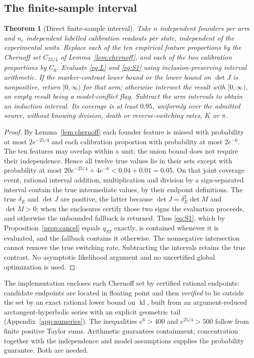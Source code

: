 \documentclass[11pt]{article}
\newtheorem{theorem}{Theorem}[section]
\theoremstyle{definition}
\newcommand{\kl}{\operatorname{kl}}
\begin{document}
\subsection{The finite-sample interval}
\begin{theorem}[Direct finite-sample interval]\label{thm:CI}
Take $n$ independent founders per arm and $n_c$ independent labelled calibration
readouts per state, independent of the experimental units. Replace each of the
ten empirical feature proportions by the Chernoff set $C_{25/4}$ of
Lemma~\ref{lem:chernoff}, and each of the two calibration proportions by
$C_{6}$. Evaluate \eqref{eq:L} and \eqref{eq:S1} using inclusion-preserving
interval arithmetic. If the marker-contrast lower bound or the lower bound on
$\det J$ is nonpositive, return $[0,\infty)$ for that arm; otherwise intersect
the result with $[0,\infty)$, an empty result being a model-conflict flag.
Subtract the arm intervals to obtain an induction interval. Its coverage is at
least $0.95$, uniformly over the admitted source, without knowing division,
death or reverse-switching rates, $K$ or $\pi$.
\end{theorem}
\begin{proof}
By Lemma~\ref{lem:chernoff} each founder feature is missed with probability at
most $2e^{-25/4}$ and each calibration proportion with probability at most
$2e^{-6}$. The ten features may overlap within a unit; the union bound does not
require their independence. Hence all twelve true values lie in their sets
except with probability at most $20e^{-25/4}+4e^{-6}<0.04+0.01=0.05$. On that
joint coverage event, rational interval addition, multiplication and division by
a sign-separated interval contain the true intermediate values, by their
endpoint definitions. The true $\delta_E$ and $\det J$ are positive, the
latter because $\det J=\delta_E^2\det M$ and $\det M>0$; when the enclosures
certify those two signs the evaluation proceeds, and otherwise the unbounded
fallback is returned. Thus
\eqref{eq:S1}, which by Proposition~\ref{prop:cancel} equals $q_{ST}$ exactly,
is contained whenever it is evaluated, and the fallback contains it
otherwise. The nonnegative intersection cannot remove the true switching rate.
Subtracting the intervals retains the true contrast. No asymptotic likelihood
argument and no uncertified global optimization is used.
\end{proof}

The implementation encloses each Chernoff set by certified rational endpoints:
candidate endpoints are located in floating point and then \emph{verified} to lie
outside the set by an exact rational lower bound on $\kl$, built from an
argument-reduced arctangent-hyperbolic series with an explicit geometric tail
(Appendix~\ref{app:numerics}). The inequalities $e^6>400$ and $e^{25/4}>500$
follow from finite positive Taylor sums. Arithmetic guarantees containment;
concentration together with the independence and model assumptions supplies the
probability guarantee. Both are needed.
\end{document}
